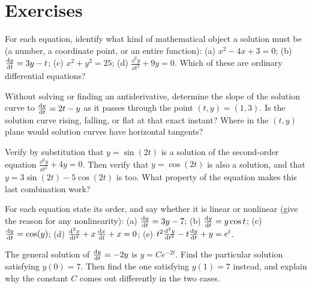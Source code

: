 \section*{Exercises}

\begin{exercise}
\label{ch36:ex-mental1}
For each equation, identify what kind of mathematical object a solution must be (a number, a coordinate point, or an entire function):
(a) $x^2 - 4x + 3 = 0$; \quad
(b) $\frac{\mathrm{d} y}{\mathrm{d} t} = 3y - t$; \quad
(c) $x^2 + y^2 = 25$; \quad
(d) $\frac{\dd^2 y}{\dd t^2} + 9y = 0$.
Which of these are ordinary differential equations?
\end{exercise}

\begin{exercise}
\label{ch36:ex-mental2}
Without solving or finding an antiderivative, determine the slope of the solution curve to $\frac{\mathrm{d} y}{\mathrm{d} t} = 2t - y$ as it passes through the point $(t, y) = (1, 3)$. Is the solution curve rising, falling, or flat at that exact instant? Where in the $(t,y)$ plane would solution curves have horizontal tangents?
\end{exercise}

\begin{exercise}
\label{ch36:ex-verify1}
Verify by substitution that $y = \sin(2t)$ is a solution of the second-order equation $\frac{\dd^2 y}{\dd t^2} + 4y = 0$. Then verify that $y = \cos(2t)$ is also a solution, and that $y = 3\sin(2t) - 5\cos(2t)$ is too. What property of the equation makes this last combination work?
\end{exercise}

\begin{exercise}
\label{ch36:ex-classify1}
For each equation state its order, and say whether it is linear or nonlinear (give the reason for any nonlinearity):
(a) $\frac{\mathrm{d} y}{\mathrm{d} t} = 3y - 7$; \quad
(b) $\frac{\mathrm{d} y}{\mathrm{d} t} = y\cos t$; \quad
(c) $\frac{\mathrm{d} y}{\mathrm{d} t} = \cos(y)$; \quad
(d) $\frac{\mathrm{d}^2 x}{\mathrm{d} t^2} + x\,\frac{\mathrm{d} x}{\mathrm{d} t} + x = 0$; \quad
(e) $t^2\frac{\mathrm{d}^2 y}{\mathrm{d} t^2} - t\frac{\mathrm{d} y}{\mathrm{d} t} + y = e^t$.
\end{exercise}

\begin{exercise}
\label{ch36:ex-ivp1}
The general solution of $\frac{\mathrm{d} y}{\mathrm{d} t} = -2y$ is $y = Ce^{-2t}$. Find the particular solution satisfying $y(0) = 7$. Then find the one satisfying $y(1) = 7$ instead, and explain why the constant $C$ comes out differently in the two cases.
\end{exercise}

